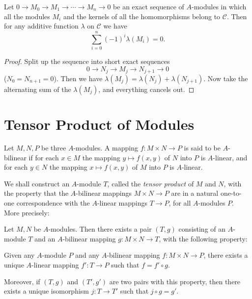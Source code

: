 \begin{proposition}\label{prop:additive-function}
Let $0 \longrightarrow M_0 \longrightarrow M_1 \longrightarrow \cdots \longrightarrow M_n \longrightarrow 0$ be an exact sequence of $A$-modules in which all the modules $M_i$ and the kernels of all the homomorphisms belong to $\mathcal{C}$. Then for any additive function $\lambda$ on $\mathcal{C}$ we have
\[
    \sum_{i=0}^n (-1)^i \lambda(M_i) = 0.
\]
\end{proposition}

\begin{proof}
Split up the sequence into short exact sequences
\[
    0 \longrightarrow N_j \longrightarrow M_j \longrightarrow N_{j+1} \longrightarrow 0
\]
($N_0 = N_{n+1} = 0$). Then we have $\lambda(M_j) = \lambda(N_j) + \lambda(N_{j+1})$. Now take the alternating sum of the $\lambda(M_j)$, and everything cancels out.
\end{proof}

\section*{Tensor Product of Modules}

Let $M, N, P$ be three $A$-modules. A mapping $f \colon M \times N \to P$ is said to be $A$-bilinear if for each $x \in M$ the mapping $y \mapsto f(x, y)$ of $N$ into $P$ is $A$-linear, and for each $y \in N$ the mapping $x \mapsto f(x, y)$ of $M$ into $P$ is $A$-linear.

We shall construct an $A$-module $T$, called the \textit{tensor product} of $M$ and $N$, with the property that the $A$-bilinear mappings $M \times N \to P$ are in a natural one-to-one correspondence with the $A$-linear mappings $T \to P$, for all $A$-modules $P$. More precisely:

\begin{proposition}\label{prop:tensor-universal}
Let $M, N$ be $A$-modules. Then there exists a pair $(T, g)$ consisting of an $A$-module $T$ and an $A$-bilinear mapping $g \colon M \times N \to T$, with the following property:

Given any $A$-module $P$ and any $A$-bilinear mapping $f \colon M \times N \to P$, there exists a unique $A$-linear mapping $f' \colon T \to P$ such that $f = f' \circ g$.

Moreover, if $(T, g)$ and $(T', g')$ are two pairs with this property, then there exists a unique isomorphism $j \colon T \to T'$ such that $j \circ g = g'$.
\end{proposition}

